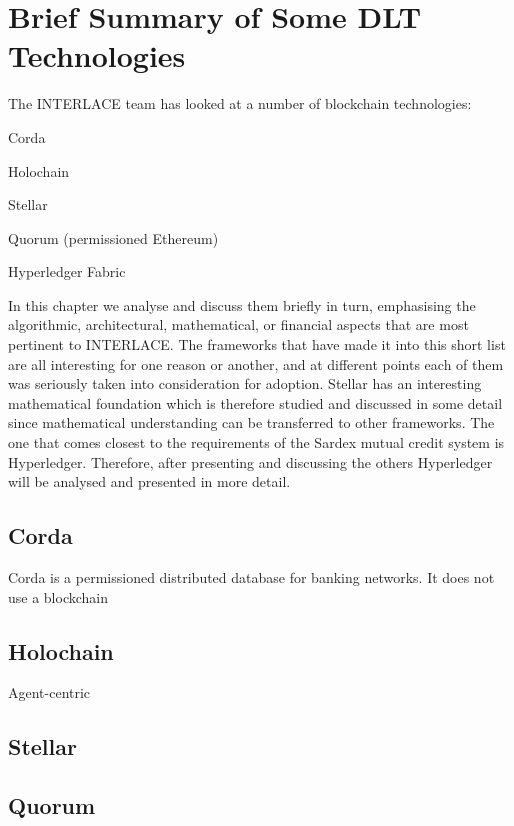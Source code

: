 \section{Brief Summary of Some DLT Technologies}

The INTERLACE team has looked at a number of blockchain technologies:
\begin{packed_item1}
\item Corda
\item Holochain
\item Stellar
\item Quorum (permissioned Ethereum)
\item Hyperledger Fabric
\end{packed_item1}
In this chapter we analyse and discuss them briefly in turn, emphasising the algorithmic, architectural,  mathematical, or financial aspects that are most pertinent to INTERLACE. The frameworks that have made it into this short list are all interesting for one reason or another, and at different points each of them was seriously taken into consideration for adoption. Stellar has an interesting mathematical foundation which is therefore studied and discussed in some detail since mathematical understanding can be transferred to other frameworks. The one that comes closest to the requirements of the Sardex mutual credit system is Hyperledger. Therefore, after presenting and discussing the others Hyperledger will be analysed and presented in more detail.


\subsection{Corda}
Corda \cite{Hearn2016} is a permissioned distributed database for banking networks. It does not use a blockchain



\subsection{Holochain}
Agent-centric
\cite{HarrisBrownEtAl2018}








\subsection{Stellar}


\subsection{Quorum}

